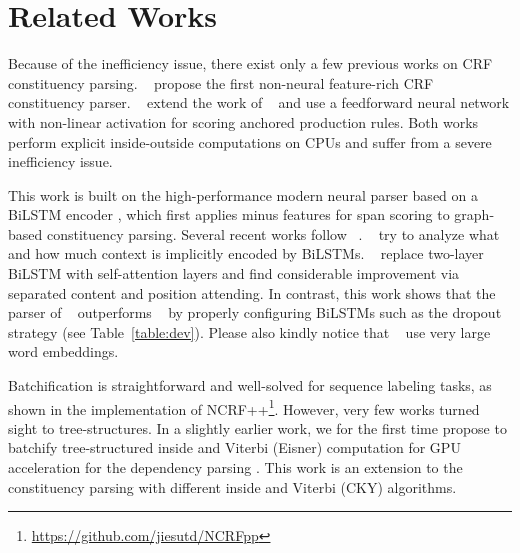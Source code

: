 \documentclass{article}
\begin{document}
\begin{table}[tb]
\begin{table}[tb]
%
  \section{Related Works}
\label{section:relwork}








Because of the inefficiency issue, there exist only a few previous works on CRF constituency parsing.
\citeauthor{finkel-etal-2008-efficient}~ propose the first non-neural feature-rich CRF constituency parser.
\citeauthor{durrett-klein-2015-neural}~ extend the work of \citeauthor{finkel-etal-2008-efficient}~ and use a feedforward neural network with non-linear activation for scoring anchored production rules.
Both works perform explicit inside-outside computations on CPUs and suffer from a severe inefficiency issue.


This work is built on the high-performance modern neural parser based on a BiLSTM encoder \cite{stern-etal-2017-minimal}, which first applies minus features \cite{cross-huang-2016-span} for span scoring to graph-based constituency parsing.
Several recent works follow \citeauthor{stern-etal-2017-minimal}~.
\citeauthor{gaddy-etal-2018-whats}~ try to analyze what and how much context is implicitly encoded by BiLSTMs.
\citeauthor{kitaev-klein-2018-constituency}~ replace two-layer BiLSTM with self-attention layers and find considerable improvement via separated content and position attending.
In contrast, this work shows that the parser of \citeauthor{stern-etal-2017-minimal}~ outperforms \citeauthor{kitaev-klein-2018-constituency}~ by properly configuring  BiLSTMs such as the dropout strategy (see Table~\ref{table:dev}). Please also kindly notice that \citeauthor{kitaev-klein-2018-constituency}~ use very large word embeddings.

Batchification is straightforward and well-solved for sequence labeling tasks, as shown in the implementation of NCRF++\footnote{\url{https://github.com/jiesutd/NCRFpp}}.
However, very few works turned sight to tree-structures.
In a slightly earlier work, we for the first time propose to batchify tree-structured inside and Viterbi (Eisner) computation for GPU acceleration for the dependency parsing \cite{zhang-etal-2020-efficient}.
This work is an extension to the constituency parsing with different inside and Viterbi (CKY) algorithms.


\end{table}
\end{table}
\end{document}
